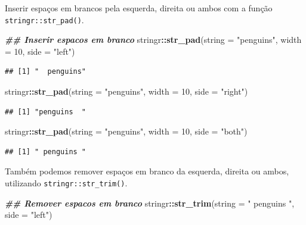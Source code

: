 \documentclass[
]{article}
\newenvironment{Shaded}{\begin{snugshade}}{\end{snugshade}}
\newcommand{\AttributeTok}[1]{\textcolor[rgb]{0.13,0.29,0.53}{#1}}
\newcommand{\DecValTok}[1]{\textcolor[rgb]{0.00,0.00,0.81}{#1}}
\newcommand{\DocumentationTok}[1]{\textcolor[rgb]{0.56,0.35,0.01}{\textbf{\textit{#1}}}}
\newcommand{\FunctionTok}[1]{\textcolor[rgb]{0.13,0.29,0.53}{\textbf{#1}}}
\newcommand{\NormalTok}[1]{#1}
\newcommand{\SpecialCharTok}[1]{\textcolor[rgb]{0.81,0.36,0.00}{\textbf{#1}}}
\newcommand{\StringTok}[1]{\textcolor[rgb]{0.31,0.60,0.02}{#1}}
\begin{document}
Inserir espaços em brancos pela esquerda, direita ou ambos com a função \texttt{stringr::str\_pad()}.

\begin{Shaded}
\begin{Highlighting}[]
\DocumentationTok{\#\# Inserir espacos em branco}
\NormalTok{stringr}\SpecialCharTok{::}\FunctionTok{str\_pad}\NormalTok{(}\AttributeTok{string =} \StringTok{"penguins"}\NormalTok{, }\AttributeTok{width =} \DecValTok{10}\NormalTok{, }\AttributeTok{side =} \StringTok{"left"}\NormalTok{)}
\end{Highlighting}
\end{Shaded}

\begin{verbatim}
## [1] "  penguins"
\end{verbatim}

\begin{Shaded}
\begin{Highlighting}[]
\NormalTok{stringr}\SpecialCharTok{::}\FunctionTok{str\_pad}\NormalTok{(}\AttributeTok{string =} \StringTok{"penguins"}\NormalTok{, }\AttributeTok{width =} \DecValTok{10}\NormalTok{, }\AttributeTok{side =} \StringTok{"right"}\NormalTok{)}
\end{Highlighting}
\end{Shaded}

\begin{verbatim}
## [1] "penguins  "
\end{verbatim}

\begin{Shaded}
\begin{Highlighting}[]
\NormalTok{stringr}\SpecialCharTok{::}\FunctionTok{str\_pad}\NormalTok{(}\AttributeTok{string =} \StringTok{"penguins"}\NormalTok{, }\AttributeTok{width =} \DecValTok{10}\NormalTok{, }\AttributeTok{side =} \StringTok{"both"}\NormalTok{)}
\end{Highlighting}
\end{Shaded}

\begin{verbatim}
## [1] " penguins "
\end{verbatim}

Também podemos remover espaços em branco da esquerda, direita ou ambos, utilizando \texttt{stringr::str\_trim()}.

\begin{Shaded}
\begin{Highlighting}[]
\DocumentationTok{\#\# Remover espacos em branco}
\NormalTok{stringr}\SpecialCharTok{::}\FunctionTok{str\_trim}\NormalTok{(}\AttributeTok{string =} \StringTok{" penguins "}\NormalTok{, }\AttributeTok{side =} \StringTok{"left"}\NormalTok{)}
\end{Highlighting}
\end{Shaded}
\end{document}
